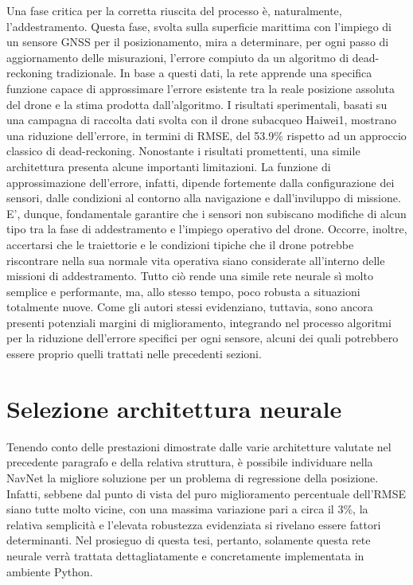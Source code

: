Una fase critica per la corretta riuscita del processo è, naturalmente, l'addestramento. Questa fase, svolta sulla superficie marittima con l'impiego di un sensore GNSS per il posizionamento, mira a determinare, per ogni passo di aggiornamento delle misurazioni, l'errore compiuto da un algoritmo di dead-reckoning tradizionale. In base a questi dati, la rete apprende una specifica funzione capace di approssimare l'errore esistente tra la reale posizione assoluta del drone e la stima prodotta dall'algoritmo. I risultati sperimentali, basati su una campagna di raccolta dati svolta con il drone subacqueo Haiwei1, mostrano una riduzione dell'errore, in termini di RMSE, del 53.9\% rispetto ad un approccio classico di dead-reckoning. Nonostante i risultati promettenti, una simile architettura presenta alcune importanti limitazioni. La funzione di approssimazione dell'errore, infatti, dipende fortemente dalla configurazione dei sensori, dalle condizioni al contorno alla navigazione e dall'inviluppo di missione. E', dunque, fondamentale garantire che i sensori non subiscano modifiche di alcun tipo tra la fase di addestramento e l'impiego operativo del drone. Occorre, inoltre, accertarsi che le traiettorie e le condizioni tipiche che il drone potrebbe riscontrare nella sua normale vita operativa siano considerate all'interno delle missioni di addestramento. Tutto ciò rende una simile rete neurale sì molto semplice e performante, ma, allo stesso tempo, poco robusta a situazioni totalmente nuove. Come gli autori stessi evidenziano, tuttavia, sono ancora presenti potenziali margini di miglioramento, integrando nel processo algoritmi per la riduzione dell'errore specifici per ogni sensore, alcuni dei quali potrebbero essere proprio quelli trattati nelle precedenti sezioni. 


\section{Selezione architettura neurale}

Tenendo conto delle prestazioni dimostrate dalle varie architetture valutate nel precedente paragrafo e della relativa struttura, è possibile individuare nella NavNet la migliore soluzione per un problema di regressione della posizione. Infatti, sebbene dal punto di vista del puro miglioramento percentuale dell'RMSE siano tutte molto vicine, con una massima variazione pari a circa il 3\%, la relativa semplicità e l'elevata robustezza evidenziata si rivelano essere fattori determinanti. Nel prosieguo di questa tesi, pertanto, solamente questa rete neurale verrà trattata dettagliatamente e concretamente implementata in ambiente Python. 

